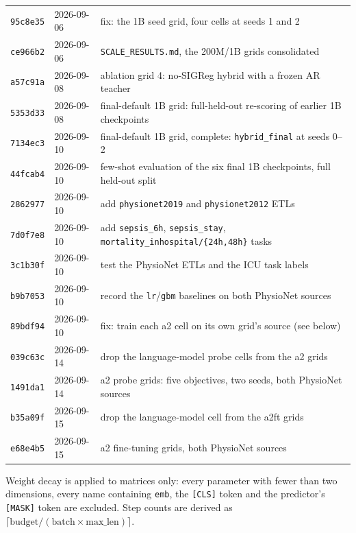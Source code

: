 \documentclass[11pt,a4paper]{article}
\newcommand{\code}[1]{\texttt{\small #1}}
\begin{document}
\begin{table}[h]
\begin{tabular}{lll}
\code{95c8e35} & 2026-09-06 & fix: the 1B seed grid, four cells at seeds 1 and 2 \\
\code{ce966b2} & 2026-09-06 & \code{SCALE\_RESULTS.md}, the 200M/1B grids consolidated \\
\code{a57c91a} & 2026-09-08 & ablation grid 4: no-SIGReg hybrid with a frozen AR teacher \\
\code{5353d33} & 2026-09-08 & final-default 1B grid: full-held-out re-scoring of earlier 1B checkpoints \\
\code{7134ec3} & 2026-09-10 & final-default 1B grid, complete: \code{hybrid\_final} at seeds 0--2 \\
\code{44fcab4} & 2026-09-10 & few-shot evaluation of the six final 1B checkpoints, full held-out split \\
\code{2862977} & 2026-09-10 & add \code{physionet2019} and \code{physionet2012} ETLs \\
\code{7d0f7e8} & 2026-09-10 & add \code{sepsis\_6h}, \code{sepsis\_stay}, \code{mortality\_inhospital/\{24h,48h\}} tasks \\
\code{3c1b30f} & 2026-09-10 & test the PhysioNet ETLs and the ICU task labels \\
\code{b9b7053} & 2026-09-10 & record the \code{lr}/\code{gbm} baselines on both PhysioNet sources \\
\code{89bdf94} & 2026-09-10 & fix: train each a2 cell on its own grid's source (see below) \\
\code{039c63c} & 2026-09-14 & drop the language-model probe cells from the a2 grids \\
\code{1491da1} & 2026-09-14 & a2 probe grids: five objectives, two seeds, both PhysioNet sources \\
\code{b35a09f} & 2026-09-15 & drop the language-model cell from the a2ft grids \\
\code{e68e4b5} & 2026-09-15 & a2 fine-tuning grids, both PhysioNet sources \\
\bottomrule
\end{tabular}
\end{table}

Weight decay is applied to matrices only: every parameter with fewer than two
dimensions, every name containing \code{emb}, the \code{[CLS]} token and the
predictor's \code{[MASK]} token are excluded. Step counts are derived as
$\lceil \text{budget} / (\text{batch} \times \text{max\_len}) \rceil$.
\end{document}
